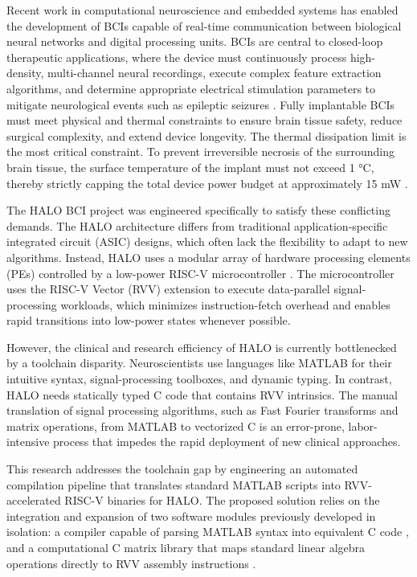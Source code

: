 Recent work in computational neuroscience and embedded systems has enabled the development of BCIs capable of real-time communication between biological neural networks and digital processing units. BCIs are central to closed-loop therapeutic applications, where the device must continuously process high-density, multi-channel neural recordings, execute complex feature extraction algorithms, and determine appropriate electrical stimulation parameters to mitigate neurological events such as epileptic seizures \cite{9138938}. Fully implantable BCIs must meet physical and thermal constraints to ensure brain tissue safety, reduce surgical complexity, and extend device longevity. The thermal dissipation limit is the most critical constraint. To prevent irreversible necrosis of the surrounding brain tissue, the surface temperature of the implant must not exceed 1 °C, thereby strictly capping the total device power budget at approximately 15 mW \cite{10120914}.

The HALO BCI project was engineered specifically to satisfy these conflicting demands. The HALO architecture differs from traditional application-specific integrated circuit (ASIC) designs, which often lack the flexibility to adapt to new algorithms. Instead, HALO uses a modular array of hardware processing elements (PEs) controlled by a low-power RISC-V microcontroller \cite{9138938}. The microcontroller uses the RISC-V Vector (RVV) extension to execute data-parallel signal-processing workloads, which minimizes instruction-fetch overhead and enables rapid transitions into low-power states whenever possible. 

However, the clinical and research efficiency of HALO is currently bottlenecked by a toolchain disparity. Neuroscientists use languages like MATLAB for their intuitive syntax, signal-processing toolboxes, and dynamic typing. In contrast, HALO needs statically typed C code that contains RVV intrinsics. The manual translation of signal processing algorithms, such as Fast Fourier transforms and matrix operations, from MATLAB to vectorized C is an error-prone, labor-intensive process that impedes the rapid deployment of new clinical approaches. 

This research addresses the toolchain gap by engineering an automated compilation pipeline that translates standard MATLAB scripts into RVV-accelerated RISC-V binaries for HALO. The proposed solution relies on the integration and expansion of two software modules previously developed in isolation: a compiler capable of parsing MATLAB syntax into equivalent C code \cite{ts}, and a computational C matrix library that maps standard linear algebra operations directly to RVV assembly instructions \cite{riscvmatrix}.

